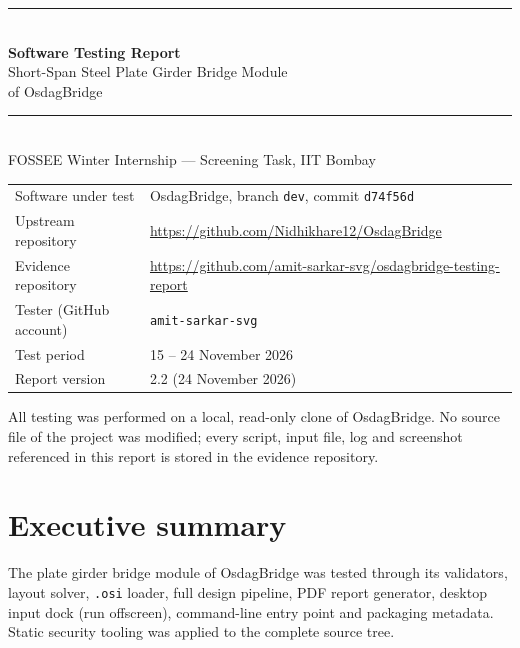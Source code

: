 \documentclass[11pt,a4paper]{article}
\begin{document}
\begin{titlepage}
\centering
\vspace*{2.5cm}
{\color{accent}\rule{\linewidth}{1.2pt}}\\[0.8cm]
{\Huge\bfseries Software Testing Report}\\[0.4cm]
{\LARGE Short-Span Steel Plate Girder Bridge Module\\[0.2cm] of OsdagBridge}\\[0.8cm]
{\color{accent}\rule{\linewidth}{1.2pt}}\\[1.5cm]
{\large FOSSEE Winter Internship --- Screening Task, IIT Bombay}\\[2.2cm]
\begin{tabular}{@{}ll@{}}
\toprule
Software under test & OsdagBridge, branch \texttt{dev}, commit \texttt{d74f56d} \\
Upstream repository & \url{https://github.com/Nidhikhare12/OsdagBridge} \\
Evidence repository & \url{https://github.com/amit-sarkar-svg/osdagbridge-testing-report} \\
Tester (GitHub account) & \texttt{amit-sarkar-svg} \\
Test period & 15 -- 24 November 2026 \\
Report version & 2.2 (24 November 2026) \\
\bottomrule
\end{tabular}
\vfill
{\small All testing was performed on a local, read-only clone of OsdagBridge. No source file of the project was modified; every script, input file, log and screenshot referenced in this report is stored in the evidence repository.}
\end{titlepage}

\tableofcontents
\newpage

\section{Executive summary}

The plate girder bridge module of OsdagBridge was tested through its validators, layout solver, \texttt{.osi} loader, full design pipeline, PDF report generator, desktop input dock (run offscreen), command-line entry point and packaging metadata. Static security tooling was applied to the complete source tree.
\end{document}
